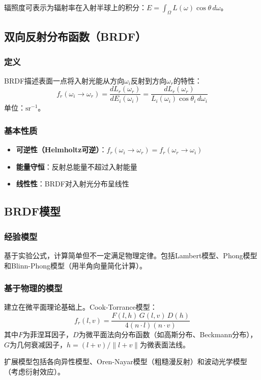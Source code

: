 \documentclass[12pt]{article}
\begin{document}
辐照度可表示为辐射率在入射半球上的积分：$E = \int_{\Omega} L(\omega) \cos\theta \, d\omega$。

\subsection{双向反射分布函数（BRDF）}

\subsubsection*{定义}
BRDF描述表面一点将入射光能从方向$\omega_i$反射到方向$\omega_r$的特性：
\[
f_r(\omega_i \to \omega_r) = \frac{dL_r(\omega_r)}{dE_i(\omega_i)} = \frac{dL_r(\omega_r)}{L_i(\omega_i) \cos\theta_i \, d\omega_i}
\]
单位：$\text{sr}^{-1}$。

\subsubsection*{基本性质}
\begin{itemize}
    \item \textbf{可逆性（Helmholtz可逆）}：$f_r(\omega_i \to \omega_r) = f_r(\omega_r \to \omega_i)$
    \item \textbf{能量守恒}：反射总能量不超过入射能量
    \item \textbf{线性性}：BRDF对入射光分布呈线性
\end{itemize}

\subsection{BRDF模型}

\subsubsection*{经验模型}
基于实验公式，计算简单但不一定满足物理定律。包括Lambert模型、Phong模型和Blinn-Phong模型（用半角向量简化计算）。

\subsubsection*{基于物理的模型}
建立在微平面理论基础上。Cook-Torrance模型：
\[
f_r(l, v) = \frac{F(l, h) \, G(l, v) \, D(h)}{4 (n \cdot l) (n \cdot v)}
\]
其中$F$为菲涅耳因子，$D$为微平面法向分布函数（如高斯分布、Beckmann分布），$G$为几何衰减因子，$h = (l + v)/\|l+v\|$为微表面法线。

扩展模型包括各向异性模型、Oren-Nayar模型（粗糙漫反射）和波动光学模型（考虑衍射效应）。
\end{document}
